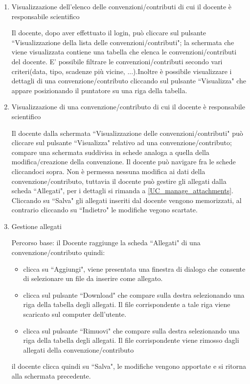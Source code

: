 \begin{enumerate}
\begin{enumerate}
 
 \item Visualizzazione dell'elenco delle convenzioni/contributi di cui il docente è responsabile scientifico\\ \label{UC_view_own_contract_list}
 
 Il docente, dopo aver effettuato il login, può cliccare sul pulsante ``Visualizzazione della lista delle convenzioni/contributi"; la schermata
 che viene visualizzata contiene una tabella che elenca le convenzioni/contributi del docente. E' possibile filtrare le convenzioni/contributi
 secondo vari criteri(data, tipo, scadenze più vicine, ...).Inoltre è possibile visualizzare i dettagli di una convenzione/contributo cliccando sul
 pulsante ``Visualizza" che appare posizionando il puntatore su una riga della tabella.
 
 \item Visualizzazione di una convenzione/contributo di cui il docente è responsabile scientifico\\ \label{UC_view_own_contract}
 
 Il docente dalla schermata ``Visualizzazione delle convenzioni/contributi" può cliccare sul pulsante ``Visualizza" relativo ad una convenzione/contributo; compare una schermata suddivisa in schede analoga a quella della modifica/creazione
 della convenzione. Il docente può navigare fra le schede cliccandoci sopra. Non è permessa nessuna modifica ai dati della convenzione/contributo, tuttavia il docente può gestire gli allegati dalla scheda ``Allegati", per i dettagli
 si rimanda a \ref{UC_manage_attachments}. Cliccando su ``Salva"
 gli allegati inseriti dal docente vengono memorizzati, al contrario cliccando su ``Indietro" le modifiche vegono scartate.
 
 \item Gestione allegati\\ \label{UC_manage_attachments}
  
 Percorso base:
 il Docente raggiunge la scheda ``Allegati" di una convenzione/contributo quindi:
  \begin{itemize}
   \item clicca su ``Aggiungi", viene presentata una finestra di dialogo che consente di selezionare un file da inserire come allegato.
   \item clicca sul pulsante ``Download" che compare sulla destra selezionando una riga della tabella degli allegati. Il file corrispondente a tale riga viene scaricato sul computer dell'utente.
   \item clicca sul pulsante ``Rimuovi" che compare sulla destra selezionando una riga della tabella degli allegati. Il file corrispondente viene rimosso dagli allegati della convenzione/contributo
  \end{itemize}
 il docente clicca quindi su ``Salva", le modifiche vengono apportate e si ritorna alla schermata precedente.
 

\end{enumerate}
\end{enumerate}
